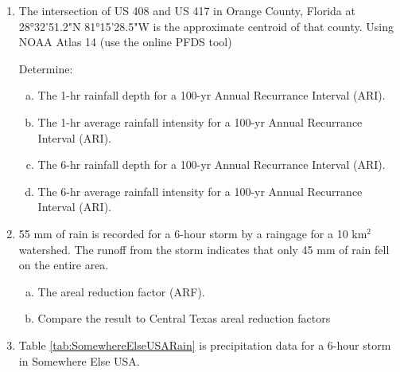 \documentclass[12pt]{article}
\begin{document}
\begin{enumerate}
\clearpage

\item The intersection of US 408 and US 417 in Orange County, Florida at 28°32'51.2"N 81°15'28.5"W is the approximate centroid of that county. Using NOAA Atlas 14 (use the online PFDS tool)

Determine:
    \begin{enumerate}[a)]
        \item The 1-hr rainfall depth for a 100-yr Annual Recurrance Interval (ARI). 
        \item The 1-hr average rainfall intensity for a 100-yr Annual Recurrance Interval (ARI). 
        \item The 6-hr rainfall depth for a 100-yr Annual Recurrance Interval (ARI). 
        \item The 6-hr average rainfall intensity for a 100-yr Annual Recurrance Interval (ARI). 
    \end{enumerate}

\clearpage

\item 55 mm of rain is recorded for a 6-hour storm by a raingage for a 10 km$^2$ watershed.  The runoff from the storm indicates that only 45 mm of rain fell on the entire area.  

    \begin{enumerate}[a)]
        \item The areal reduction factor  (ARF). 
        \item Compare the result to Central Texas areal reduction factors 
    \end{enumerate}

\clearpage
\item Table \ref{tab:SomewhereElseUSARain} is precipitation data for a 6-hour storm in Somewhere Else USA.


\end{enumerate}
\end{document}
